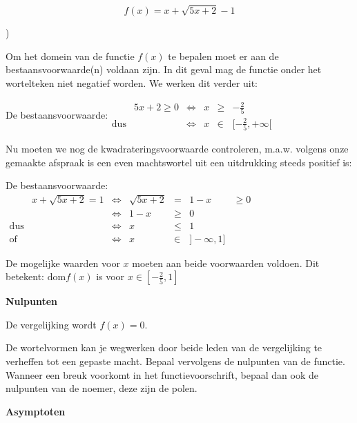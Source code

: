 \begin{voorbeeld}
\begin{equation*}
f(x)=x+\sqrt{5x+2}-1
\end{equation*}


\begin{figure}[H]
		
\end{figure})



Om het domein van de functie $f(x)$ te bepalen moet er aan de bestaansvoorwaarde(n)
voldaan zijn. In dit geval mag de functie onder het wortelteken niet
negatief worden. We werken dit verder uit:

De bestaansvoorwaarde:$\begin{array}{cclccc}
 & 5x+2\geq0
 & \iff & x & \geq & -\frac{2}{5}\\
\textrm{dus} & & \iff & x & \in & [-\frac{2}{5},+\infty[
\end{array}$

Nu moeten we nog de kwadrateringsvoorwaarde controleren, m.a.w. volgens
onze gemaakte afspraak is een even machtswortel uit een uitdrukking
steeds positief is:

De bestaansvoorwaarde:
$\begin{array}{cccclcc}
 & x+\sqrt{5x+2}=1 & \iff & \sqrt{5x+2} & = & 1-x & \geq0\\
 & & \iff & 1-x & \geq & 0\\
\textrm{dus} & & \iff & x & \leq & 1\\
\textrm{of} & & \iff & x & \in & ]-\infty,1]
\end{array}$

De mogelijke waarden voor $x$ moeten aan beide voorwaarden voldoen.
Dit betekent: $\textrm{dom}f(x)$ is voor $x\in[-\frac{2}{5},1]$

\end{voorbeeld}

\textbf{Nulpunten}

De vergelijking wordt $f(x)=0$.

De wortelvormen kan je wegwerken door beide leden van de vergelijking
te verheffen tot een gepaste macht. Bepaal vervolgens de nulpunten
van de functie. Wanneer een breuk voorkomt in het functievoorschrift,
bepaal dan ook de nulpunten van de noemer, deze zijn de polen.

\textbf{Asymptoten}

